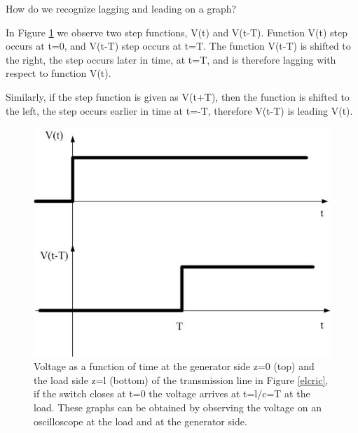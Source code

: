 \documentclass{ximera}
\begin{document}
\begin{definition}
How do we recognize lagging and leading on a graph? 

In Figure \ref{timedelaysig} we observe two step functions, V(t) and V(t-T). Function V(t) step occurs at t=0, and V(t-T) step occurs at t=T. The function V(t-T) is shifted to the right, the step occurs later in time, at t=T, and is therefore lagging with respect to function V(t). 


Similarly, if the step function is given as V(t+T), then the function is shifted to the left, the step occurs earlier in time at t=-T, therefore V(t-T) is leading V(t).


\begin{figure}[htbp]
\begin{center}
\includegraphics[scale=0.5]{jpg/timedelayedsignal.jpg}  
\end{center}
\caption{Voltage as a function of time at the generator side z=0 (top) and the load side z=l (bottom) of the transmission line in Figure \ref{elcric}, if the switch closes at t=0 the voltage arrives at t=l/c=T at the load. These graphs can be obtained by observing the voltage on an oscilloscope at the load and at the generator side.}
\label{timedelaysig} 
 \end{figure}
\end{definition}
\end{document}
